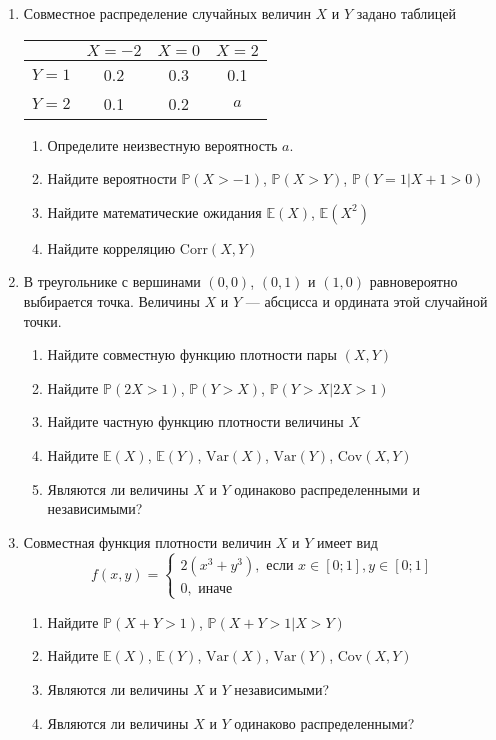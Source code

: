 \documentclass[12pt,a4paper]{article}
\newcommand{\E}{\mathbb{E}}
\renewcommand{\P}{\mathbb{P}}
\newcommand{\Var}{\mathrm{Var}}
\newcommand{\Cov}{\mathrm{Cov}}
\newcommand{\Corr}{\mathrm{Corr}}
\begin{document}
\begin{enumerate}
\item Совместное распределение случайных величин $X$ и $Y$ задано таблицей

\begin{tabular}{c|ccc}
 & $X=-2$ & $X=0$ & $X=2$ \\ 
\hline 
$Y=1$ & 0.2 & 0.3 & 0.1 \\ 
$Y=2$ & 0.1 & 0.2 & $a$ \\ 
\end{tabular} 

\begin{enumerate}
\item Определите неизвестную вероятность $a$. 
\item Найдите вероятности $\P(X>-1)$, $\P(X>Y)$, $\P(Y=1 | X+1>0)$
\item Найдите математические ожидания $\E(X)$, $\E(X^2)$
\item Найдите корреляцию $\Corr(X,Y)$
\end{enumerate}

\item В треугольнике с вершинами $(0,0)$, $(0,1)$ и $(1,0)$ равновероятно выбирается точка. Величины $X$ и $Y$ --- абсцисса и ордината этой случайной точки. 
\begin{enumerate}
\item Найдите совместную функцию плотности пары $(X,Y)$
\item Найдите $\P(2X>1)$, $\P(Y>X)$, $\P(Y>X | 2X>1)$
\item Найдите частную функцию плотности величины $X$
\item Найдите $\E(X)$, $\E(Y)$, $\Var(X)$, $\Var(Y)$, $\Cov(X,Y)$
\item Являются ли величины $X$ и $Y$ одинаково распределенными и независимыми?
\end{enumerate}

\item Совместная функция плотности величин $X$ и $Y$ имеет вид
\begin{equation}
f(x,y)=\begin{cases}
2(x^3+y^3), \mbox{ если } x\in [0;1], y\in [0;1] \\
0, \mbox{ иначе}
\end{cases} 
\end{equation}
\begin{enumerate}
\item  Найдите $\P(X+Y>1)$, $\P(X+Y>1 | X>Y)$
\item Найдите $\E(X)$, $\E(Y)$, $\Var(X)$, $\Var(Y)$, $\Cov(X,Y)$
\item  Являются ли величины $X$ и $Y$ независимыми? 
\item Являются ли величины $X$ и $Y$ одинаково распределенными?
\end{enumerate}




\end{enumerate}
\end{document}
